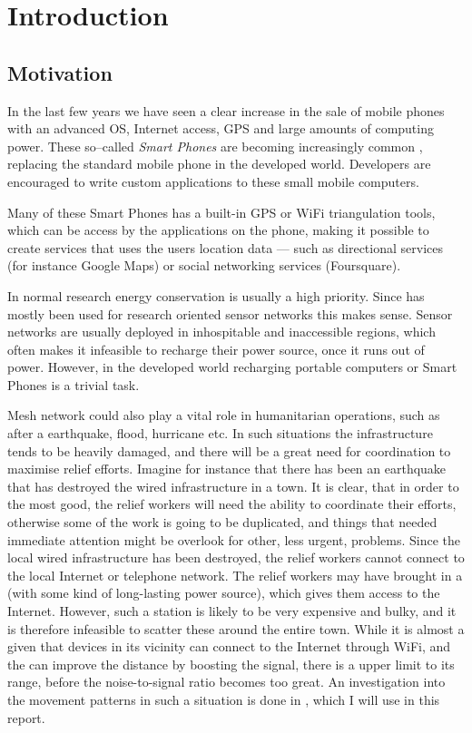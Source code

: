 \section{Introduction}
\label{section:introduction} 

\subsection{Motivation}

In the last few years we have seen a clear increase in the sale of mobile phones with an advanced OS, Internet access, GPS and large amounts of computing power. These so--called \emph{Smart Phones} are becoming increasingly common , replacing the standard mobile phone in the developed world. Developers are encouraged to write custom applications to these small mobile computers.
 
Many of these Smart Phones has a built-in GPS or WiFi triangulation tools, which can be access by the applications on the phone, making it possible to create services that uses the users location data --- such as directional services (for instance Google Maps) or social networking services (Foursquare).

In normal \anet research energy conservation is usually a high priority. Since \anet has mostly been used for research oriented sensor networks this makes sense. Sensor networks are usually deployed in inhospitable and inaccessible regions, which often makes it infeasible to recharge their power source, once it runs out of power. However, in the developed world recharging portable computers or Smart Phones is a trivial task. 

Mesh network could also play a vital role in humanitarian operations, such as after a earthquake, flood, hurricane etc. In such situations the infrastructure tends to be heavily damaged, and there will be a great need for coordination to maximise relief efforts. Imagine for instance that there has been an earthquake that has destroyed the wired infrastructure in a town. It is clear, that in order to the most good, the relief workers will need the ability to coordinate their efforts, otherwise some of the work is going to be duplicated, and things that needed immediate attention might be overlook for other, less urgent, problems. Since the local wired infrastructure has been destroyed, the relief workers cannot connect to the local Internet or telephone network. The relief workers may have brought in a \wbs (with some kind of long-lasting power source), which gives them access to the Internet. However, such a station is likely to be very expensive and bulky, and it is therefore infeasible to scatter these around the entire town. While it is almost a given that devices in its vicinity can connect to the Internet through WiFi, and the \wbs can improve the distance by boosting the signal, there is a upper limit to its range, before the noise-to-signal ratio becomes too great. An investigation into the movement patterns in such a situation is done in \cite{disasterArea}, which I will use in this report.

